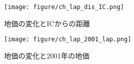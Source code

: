 \begin{figure}[H]
  \centering
  \texttt{[image: figure/ch\_lap\_dis\_IC.png]}
  \caption{地価の変化とICからの距離}
  \label{deruta_landprice disIC_m}
\end{figure}

\begin{figure}[H]
  \centering
  \texttt{[image: figure/ch\_lap\_2001\_lap.png]}
  \caption{地価の変化と2001年の地価}
  \label{deruta_landprice_H13_landprice}
\end{figure}






